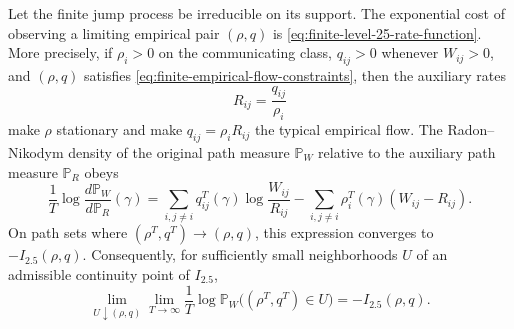 \begin{proposition}
\label{prop:finite-empirical-flow-cost}
Let the finite jump process be irreducible on its support.  The exponential
cost of observing a limiting empirical pair \((\rho,q)\) is
\eqref{eq:finite-level-25-rate-function}.  More precisely, if
\(\rho_i>0\) on the communicating class, \(q_{ij}>0\) whenever
\(W_{ij}>0\), and \((\rho,q)\) satisfies
\eqref{eq:finite-empirical-flow-constraints}, then the auxiliary rates
\begin{equation}
  R_{ij}=\frac{q_{ij}}{\rho_i}
  \label{eq:finite-level-25-auxiliary-rates}
\end{equation}
make \(\rho\) stationary and make \(q_{ij}=\rho_iR_{ij}\) the typical
empirical flow.  The Radon--Nikodym density of the original path measure
\(\mathbb P_W\) relative to the auxiliary path measure \(\mathbb P_R\) obeys
\begin{equation}
  \frac1T\log\frac{d\mathbb P_W}{d\mathbb P_R}(\gamma)
  =
  \sum_{i,j\ne i}
  q^T_{ij}(\gamma)\log\frac{W_{ij}}{R_{ij}}
  -
  \sum_{i,j\ne i}
  \rho^T_i(\gamma)(W_{ij}-R_{ij}) .
  \label{eq:finite-level-25-rn-density}
\end{equation}
On path sets where \((\rho^T,q^T)\to(\rho,q)\), this expression converges
to \(-I_{2.5}(\rho,q)\).  Consequently, for sufficiently small
neighborhoods \(U\) of an admissible continuity point of \(I_{2.5}\),
\[
  \lim_{U\downarrow(\rho,q)}
  \lim_{T\to\infty}
  \frac1T\log
  \mathbb P_W\bigl((\rho^T,q^T)\in U\bigr)
  =
  -I_{2.5}(\rho,q).
\]
\end{proposition}

